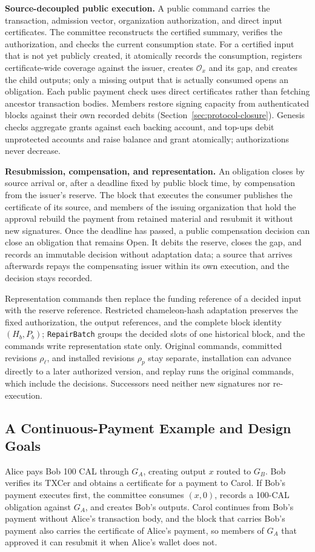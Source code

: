 \noindent\textbf{Source-decoupled public execution.}
A public command carries the transaction, admission vector, organization authorization, and direct input certificates. The committee reconstructs the certified summary, verifies the authorization, and checks the current consumption state. For a certified input that is not yet publicly created, it atomically records the consumption, registers certificate-wide coverage against the issuer, creates $\mathcal O_x$ and its gap, and creates the child outputs; only a missing output that is actually consumed opens an obligation. Each public payment check uses direct certificates rather than fetching ancestor transaction bodies. Members restore signing capacity from authenticated blocks against their own recorded debits (Section~\ref{sec:protocol-closure}). Genesis checks aggregate grants against each backing account, and top-ups debit unprotected accounts and raise balance and grant atomically; authorizations never decrease.

\noindent\textbf{Resubmission, compensation, and representation.}
An obligation closes by source arrival or, after a deadline fixed by public block time, by compensation from the issuer's reserve. The block that executes the consumer publishes the certificate of its source, and members of the issuing organization that hold the approval rebuild the payment from retained material and resubmit it without new signatures. Once the deadline has passed, a public compensation decision can close an obligation that remains Open. It debits the reserve, closes the gap, and records an immutable decision without adaptation data; a source that arrives afterwards repays the compensating issuer within its own execution, and the decision stays recorded.

Representation commands then replace the funding reference of a decided input with the reserve reference. Restricted chameleon-hash adaptation preserves the fixed authorization, the output references, and the complete block identity $(H_b,P_b)$; \texttt{RepairBatch} groups the decided slots of one historical block, and the commands write representation state only. Original commands, committed revisions $\rho_\ell$, and installed revisions $\rho_p$ stay separate, installation can advance directly to a later authorized version, and replay runs the original commands, which include the decisions. Successors need neither new signatures nor re-execution.

\subsection{A Continuous-Payment Example and Design Goals}
\label{sec:model-example}
Alice pays Bob 100 CAL through $G_A$, creating output $x$ routed to $G_B$. Bob verifies its TXCer and obtains a certificate for a payment to Carol. If Bob's payment executes first, the committee consumes $(x,0)$, records a 100-CAL obligation against $G_A$, and creates Bob's outputs. Carol continues from Bob's payment without Alice's transaction body, and the block that carries Bob's payment also carries the certificate of Alice's payment, so members of $G_A$ that approved it can resubmit it when Alice's wallet does not.

